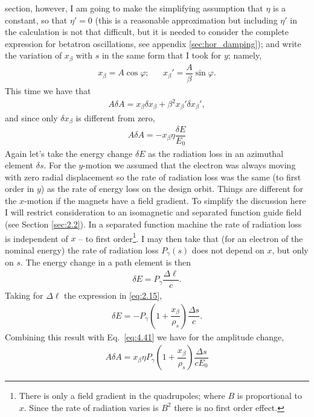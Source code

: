 section, however, I am going to make the simplifying assumption that $\eta$ is a constant, so that $\eta' = 0$ (this is a reasonable approximation but including $\eta'$ in the calculation is not that difficult, but it is needed to consider the complete expression for betatron oscillations, see appendix \ref{sec:hor_damping}); and write the variation of $x_\beta$ with $s$ in the same form that I took for $y$; namely,
\begin{align}
	x_\beta = A \cos \varphi; && x_\beta' = \dfrac{A}{\beta} \sin \varphi.
\end{align}
This time we have that
\begin{align}
	A \delta A = x_\beta \delta x_\beta + \beta^2 x_\beta' \delta x_\beta',
\end{align}
and since only $\delta x_\beta$ is different from zero,
\begin{align} \label{eq:4.41}
	A \delta A = - x_\beta \eta \dfrac{\delta E}{E_0}
\end{align}
Again let's take the energy change $\delta E$ as the radiation loss in an azimuthal element $\delta s$. For the $y$-motion we assumed that the electron was always moving with zero radial displacement so the rate of radiation loss was the same (to first order in $y$) as the rate of energy loss on the design orbit. Things are different for the $x$-motion if the magnets have a field gradient. To simplify the discussion here I will restrict consideration to an isomagnetic
 and separated function guide field (see Section \ref{sec:2.2}). In a separated function machine the rate of radiation loss is independent of $x$ -- to first order\footnote{There is only a field gradient in the quadrupoles; where $B$ is proportional to $x$. Since the rate of radiation varies is $B^2$ there is no first order effect.}. I may then take that (for an electron of the nominal energy) the rate of radiation loss $P_\gamma(s)$ does not depend on $x$, but only on $s$.
The energy change in a path element is then
\begin{align}
	\delta E = P_\gamma \dfrac{\Delta \ell}{c}.
\end{align}
Taking for $\Delta \ell$ the expression in \eqref{eq:2.15},
\begin{align}
	\delta E = - P_\gamma \left( 1 + \dfrac{x_\beta}{\rho_s} \right) \dfrac{\Delta s}{c} .
\end{align}
Combining this result with Eq.~\eqref{eq:4.41} we have for the amplitude change,
\begin{align}
	A \delta A = x_\beta \eta P_\gamma \left( 1 + \dfrac{x_\beta}{\rho_s} \right) \dfrac{\Delta s}{cE_0}
\end{align}
